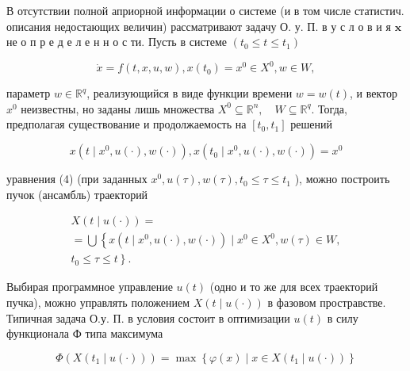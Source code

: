 \documentclass[10pt]{article}
\begin{document}
В отсутствии полной априорной информации о системе (и в том числе статистич. описания недостающих величин) рассматривают задачу О. у. П. в у с л о в и я $\mathbf{x}$ не о п р е д е л е н н о с ти. Пусть в системе $\left(t_{0} \leqslant t \leqslant t_{1}\right)$



\[

\dot{x}=f(t, x, u, w), x\left(t_{0}\right)=x^{0} \in X^{0}, w \in W,

\]



параметр $w \in \mathbb{R}^{q}$, реализующийся в виде функции времени $w=w(t)$, и вектор $x^{0}$ неизвестны, но заданы лишь множества $X^{0} \subseteq \mathbb{R}^{n}, \quad W \subseteq \mathbb{R}^{q}$. Тогда, предполагая существование и продолжаемость на $\left[t_{0}, t_{1}\right]$ решений



\[

x\left(t \mid x^{0}, u(\cdot), w(\cdot)\right), x\left(t_{0} \mid x^{0}, u(\cdot), w(\cdot)\right)=x^{0}

\]



уравнения (4) (при заданных $x^{0}, u(\tau), w(\tau), t_{0} \leqslant \tau \leqslant t_{1}$ ), можно построить пучок (ансамбль) траекторий



\[

\begin{gathered}

X(t \mid u(\cdot))= \\

=\bigcup\left\{x\left(t \mid x^{0}, u(\cdot), w(\cdot)\right) \mid x^{0} \in X^{0}, w(\tau) \in W,\right. \\

\left.t_{0} \leqslant \tau \leqslant t\right\} .

\end{gathered}

\]



Выбирая программное управление $u(t)$ (одно и то же для всех траекторий пучка), можно управлять положением $X(t \mid u(\cdot))$ в фазовом простравстве. Типичная задача О.у. П. в условия состоит в оптимизации $u(t)$ в силу функционала Ф типа максимума



\[

\Phi\left(X\left(t_{1} \mid u(\cdot)\right)\right)=\max \left\{\varphi(x) \mid x \in X\left(t_{1} \mid u(\cdot)\right)\right\}

\]
\end{document}
